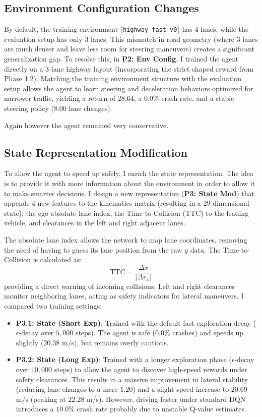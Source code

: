 \documentclass{article}
\begin{document}
\subsection{Environment Configuration Changes}
By default, the training environment (\texttt{highway-fast-v0}) has 4 lanes, while the evaluation setup has only 3 lanes. This mismatch in road geometry (where 3 lanes are much denser and leave less room for steering maneuvers) creates a significant generalization gap. To resolve this, in \textbf{P2: Env Config}, I trained the agent directly on a 3-lane highway layout (incorporating the strict shaped reward from Phase 1.2). Matching the training environment structure with the evaluation setup allows the agent to learn steering and deceleration behaviors optimized for narrower traffic, yielding a return of $28.64$, a $0.0\%$ crash rate, and a stable steering policy ($8.00$ lane changes).

Again however the agent remained very conservative.

\subsection{State Representation Modification}
To allow the agent to speed up safely, I enrich the state representation. The idea is to provide it with more information about the environment in order to allow it to make smarter decisions. I design a new representation (\textbf{P3: State Mod}) that appends 4 new features to the kinematics matrix (resulting in a 29-dimensional state): the ego absolute lane index, the Time-to-Collision (TTC) to the leading vehicle, and clearances in the left and right adjacent lanes. 

The absolute lane index allows the network to map lane coordinates, removing the need of having to guess its lane position from the raw $y$ data. The Time-to-Collision is calculated as:
\begin{equation}
    \text{TTC} = \frac{\Delta x}{|\Delta v_x|}
\end{equation}
providing a direct warning of incoming collisions. Left and right clearances monitor neighboring lanes, acting as safety indicators for lateral maneuvers. I compared two training settings:
\begin{itemize}
    \item \textbf{P3.1: State (Short Exp)}: Trained with the default fast exploration decay ($\epsilon$-decay over $5,000$ steps). The agent is safe ($0.0\%$ crashes) and speeds up slightly ($20.38$ m/s), but remains overly cautious.
    \item \textbf{P3.2: State (Long Exp)}: Trained with a longer exploration phase ($\epsilon$-decay over $10,000$ steps) to allow the agent to discover high-speed rewards under safety clearances. This results in a massive improvement in lateral stability (reducing lane changes to a mere $1.20$) and a slight speed increase to $20.69$ m/s (peaking at $22.28$ m/s). However, driving faster under standard DQN introduces a $10.0\%$ crash rate probably due to unstable Q-value estimates.
\end{itemize}
\end{document}
